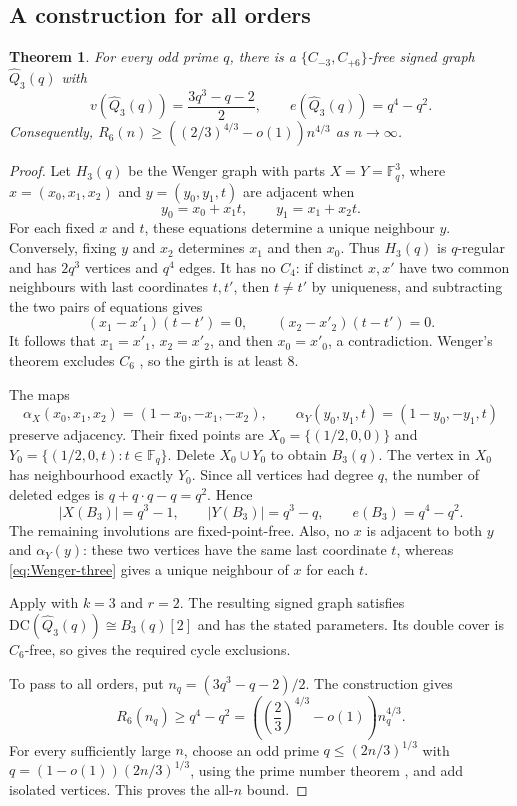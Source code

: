 \documentclass{article}
\newcommand{\DC}{\mathrm{DC}}
\newcommand{\FF}{\mathbb{F}}
\newtheorem{theorem}{Theorem}[section]
\theoremstyle{definition}
\theoremstyle{remark}
\begin{document}
\subsection{A construction for all orders}

\begin{theorem}\label{thm:explicit-C6}\label{cor:all-n-C6}
For every odd prime $q$, there is a $\{C_{-3},C_{+6}\}$-free signed
graph $\widehat Q_3(q)$ with
\[
v(\widehat Q_3(q))=\frac{3q^3-q-2}{2},\qquad
e(\widehat Q_3(q))=q^4-q^2.
\]
Consequently, $R_6(n)\geq((2/3)^{4/3}-o(1))n^{4/3}$ as $n\to\infty$.
\end{theorem}
\begin{proof}
Let $H_3(q)$ be the Wenger graph with parts $X=Y=\FF_q^3$, where
$x=(x_0,x_1,x_2)$ and $y=(y_0,y_1,t)$ are adjacent when
\begin{equation}\label{eq:Wenger-three}
y_0=x_0+x_1t,\qquad y_1=x_1+x_2t.
\end{equation}
For each fixed $x$ and $t$, these equations determine a unique neighbour
$y$.  Conversely, fixing $y$ and $x_2$ determines $x_1$ and then $x_0$.
Thus $H_3(q)$ is $q$-regular and has $2q^3$ vertices and $q^4$ edges.
It has no $C_4$: if distinct $x,x'$ have two common neighbours with last
coordinates $t,t'$, then $t\neq t'$ by uniqueness, and subtracting the
two pairs of equations gives
\[
(x_1-x'_1)(t-t')=0,\qquad (x_2-x'_2)(t-t')=0.
\]
It follows that $x_1=x'_1$, $x_2=x'_2$, and then $x_0=x'_0$, a
contradiction.  Wenger's theorem excludes $C_6$ \cite{MR1109426}, so the
girth is at least $8$.

The maps
\[
\alpha_X(x_0,x_1,x_2)=(1-x_0,-x_1,-x_2),\qquad
\alpha_Y(y_0,y_1,t)=(1-y_0,-y_1,t)
\]
preserve adjacency.  Their fixed points are
$X_0=\{(1/2,0,0)\}$ and $Y_0=\{(1/2,0,t):t\in\FF_q\}$.
Delete $X_0\cup Y_0$ to obtain $B_3(q)$.  The vertex in $X_0$ has
neighbourhood exactly $Y_0$.  Since all vertices had degree $q$, the
number of deleted edges is $q+q\cdot q-q=q^2$.  Hence
\begin{equation}\label{eq:B3-parameters}
|X(B_3)|=q^3-1,\qquad |Y(B_3)|=q^3-q,\qquad e(B_3)=q^4-q^2.
\end{equation}
The remaining involutions are fixed-point-free.  Also, no $x$ is adjacent
to both $y$ and $\alpha_Y(y)$: these two vertices have the same last
coordinate $t$, whereas \eqref{eq:Wenger-three} gives a unique neighbour
of $x$ for each $t$.

Apply  with $k=3$ and $r=2$.
The resulting signed graph satisfies
$\DC(\widehat Q_3(q))\cong B_3(q)[2]$ and has the stated parameters.
Its double cover is $C_6$-free, so  gives the required
cycle exclusions.

To pass to all orders, put $n_q=(3q^3-q-2)/2$.  The construction gives
\[
R_6(n_q)\geq q^4-q^2=
\left(\left(\frac23\right)^{4/3}-o(1)\right)n_q^{4/3}.
\]
For every sufficiently large $n$, choose an odd prime
$q\leq(2n/3)^{1/3}$ with $q=(1-o(1))(2n/3)^{1/3}$, using the prime
number theorem \cite{Apostol1976}, and add isolated vertices.  This proves
the all-$n$ bound.
\end{proof}
\end{document}
